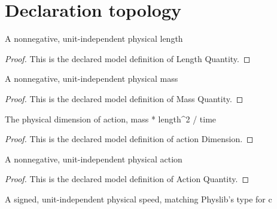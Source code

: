 \section{Declaration topology}
\begin{definition}
  \label{def:physics:phyx-mini-0587:phyxminiproblems-problemphyxmini0587-lengthquantity}
  A nonnegative, unit-independent physical length
\end{definition}
\begin{proof}
  This is the declared model definition of Length Quantity.
\end{proof}
\begin{definition}
  \label{def:physics:phyx-mini-0587:phyxminiproblems-problemphyxmini0587-massquantity}
  A nonnegative, unit-independent physical mass
\end{definition}
\begin{proof}
  This is the declared model definition of Mass Quantity.
\end{proof}
\begin{definition}
  \label{def:physics:phyx-mini-0587:phyxminiproblems-problemphyxmini0587-actiondimension}
  The physical dimension of action, mass * length\textasciicircum{}2 / time
\end{definition}
\begin{proof}
  This is the declared model definition of action Dimension.
\end{proof}
\begin{definition}
  \label{def:physics:phyx-mini-0587:phyxminiproblems-problemphyxmini0587-actionquantity}
  A nonnegative, unit-independent physical action
\end{definition}
\begin{proof}
  This is the declared model definition of Action Quantity.
\end{proof}
\begin{definition}
  \label{def:physics:phyx-mini-0587:phyxminiproblems-problemphyxmini0587-lightspeedquantity}
  A signed, unit-independent physical speed, matching Physlib's type for c
\end{definition}
